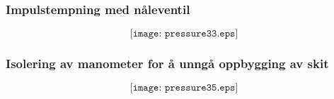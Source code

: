 \documentclass[aspectratio=169,xcolor=dvipsnames]{beamer}
\begin{document}
%
%
\begin{frame}
	\frametitle{Impulstempning med nåleventil}

	$$\texttt{[image: pressure33.eps]}$$
\end{frame}

%
%
%
%
%
%
\begin{frame}
	\frametitle{Isolering av manometer for å unngå oppbygging av skit}

	$$\texttt{[image: pressure35.eps]}$$
\end{frame}
\end{document}
